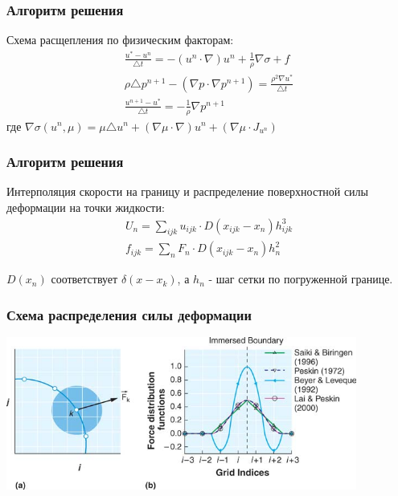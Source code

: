 \documentclass[14pt]{beamer}
\begin{document}
\begin{frame}
\frametitle{Алгоритм решения}
Схема расщепления по физическим факторам:
\begin{gather}
    \label{eq:split_first}
    \frac{u^* - u^n}{\triangle t} = - (u^n \cdot \nabla) u^n + \frac{1}{\rho} \nabla \sigma + f\\
    \label{eq:split_second}
    \rho \triangle p^{n+1} - (\nabla p \cdot \nabla p^{n+1}) = \frac{\rho^2 \nabla u^*}{\triangle t}\\
    \label{eq:split_third}
    \frac{u^{n+1} - u^*}{\triangle t} = - \frac{1}{\rho} \nabla p^{n+1}
\end{gather}
где $\nabla \sigma (u^n, \mu) = \mu \triangle u^n + (\nabla \mu \cdot \nabla) u^n + (\nabla \mu \cdot J_{u^n}) $
\end{frame}

\begin{frame}
\frametitle{Алгоритм решения}
Интерполяция скорости на границу и распределение поверхностной силы деформации на точки жидкости:
\begin{gather}
    \label{eq:interpolation}
    U_n = \sum_{ijk}u_{ijk} \cdot D(x_{ijk} - x_n) h_{ijk}^3 \\
    \label{eq:spreading}
    f_{ijk} = \sum_n F_n \cdot D(x_{ijk} - x_n) h^2_n
\end{gather}

$D(x_n)$ соответствует $\delta(x - x_k)$, а $h_n$ - шаг сетки по погруженной границе.
\end{frame}

\begin{frame}
\frametitle{Схема распределения силы деформации}
    \begin{center}
        \includegraphics[width=11.5cm]{delta_function.png}
    \end{center}
\end{frame}
\end{document}
